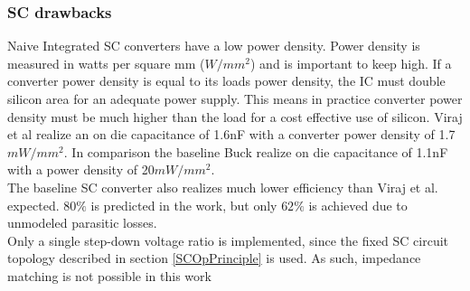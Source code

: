 \documentclass[letterpaper,twocolumn,10pt]{article}
\begin{document}
\subsubsection{SC drawbacks } 
Naive Integrated SC converters have a low power density. Power density is measured in watts per square mm ($W/mm^2$) and is important to keep high. If a converter power density is equal to its loads power density, the IC must double silicon area for an adequate power supply. This means in practice converter power density must be much higher than the load for a cost effective use of silicon. Viraj et al \cite{Viraj2007} realize an on die capacitance of 1.6nF with a converter power density of 1.7$mW/mm^2$. In comparison  the baseline Buck \cite{Alimadadi2008} realize on die capacitance of 1.1nF with a power density of 20$mW/mm^2$.\\
The baseline SC converter also realizes much lower efficiency than Viraj et al. expected. $80\%$ is predicted in the work, but only $62\%$ is achieved due to unmodeled parasitic losses.\\
Only a single step-down voltage ratio is implemented, since the fixed SC circuit topology described in section \ref{SCOpPrinciple} is used. As such, impedance matching is not possible in this work\\\
\end{document}
